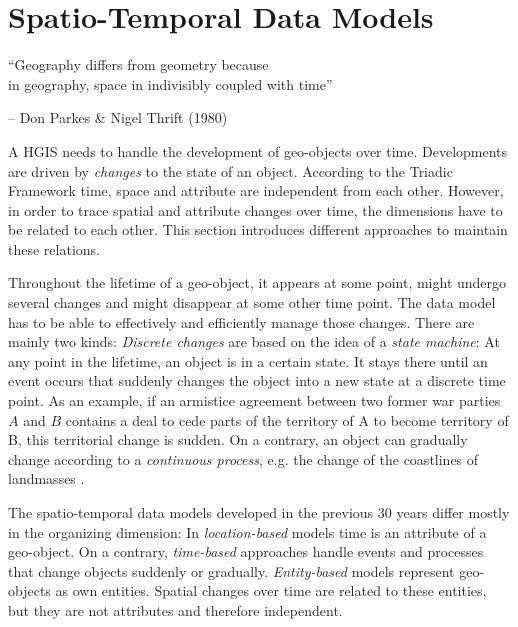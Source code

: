 


\section{Spatio-Temporal Data Models} %
\label{sec:spatio_temporal_data_models}

\begin{quoteit}
  ``Geography differs from geometry because \\
  in geography, space in indivisibly coupled with time''
\end{quoteit}
\hfill -- Don Parkes \& Nigel Thrift (1980)

A HGIS needs to handle the development of geo-objects over time. Developments are driven by \emph{changes} to the state of an object. According to the Triadic Framework time, space and attribute are independent from each other. However, in order to trace spatial and attribute changes over time, the dimensions have to be related to each other. This section introduces different approaches to maintain these relations.

Throughout the lifetime of a geo-object, it appears at some point, might undergo several changes and might disappear at some other time point. The data model has to be able to effectively and efficiently manage those changes. There are mainly two kinds: \emph{Discrete changes} are based on the idea of a \emph{state machine}: At any point in the lifetime, an object is in a certain state. It stays there until an event occurs that suddenly changes the object into a new state at a discrete time point. As an example, if an armistice agreement between two former war parties $A$ and $B$ contains a deal to cede parts of the territory of A to become territory of B, this territorial change is sudden. On a contrary, an object can gradually change according to a \emph{continuous process}, e.g. the change of the coastlines of landmasses
\cite{peuquet99}.

The spatio-temporal data models developed in the previous 30 years differ mostly in the organizing dimension: In \emph{location-based} models time is an attribute of a geo-object. On a contrary, \emph{time-based} approaches handle events and processes that change objects suddenly or gradually. \emph{Entity-based} models represent geo-objects as own entities. Spatial changes over time are related to these entities, but they are not attributes and therefore independent.

